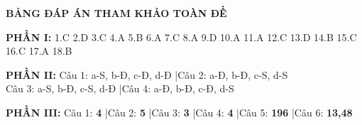 \documentclass[11pt,a4paper]{article}
\begin{document}
\vspace{0.3cm}
\noindent
\textbf{\color{hfRed}\large BẢNG ĐÁP ÁN THAM KHẢO TOÀN ĐỀ}

\vspace{0.1cm}
\noindent
\textbf{\color{mainGreen}PHẦN I:} 1.C \quad 2.D \quad 3.C \quad 4.A \quad 5.B \quad 6.A \quad 7.C \quad 8.A \quad 9.D \quad 10.A \quad 11.A \quad 12.C \quad 13.D \quad 14.B \quad 15.C \quad 16.C \quad 17.A \quad 18.B

\vspace{0.1cm}
\noindent
\textbf{\color{mainGreen}PHẦN II:} Câu 1: a-S, b-Đ, c-Đ, d-Đ \quad|\quad Câu 2: a-Đ, b-Đ, c-S, d-S\\
Câu 3: a-S, b-Đ, c-S, d-Đ \quad|\quad Câu 4: a-Đ, b-Đ, c-Đ, d-S

\vspace{0.1cm}
\noindent
\textbf{\color{mainGreen}PHẦN III:} Câu 1: \textbf{4} \quad|\quad Câu 2: \textbf{5} \quad|\quad Câu 3: \textbf{3} \quad|\quad Câu 4: \textbf{4} \quad|\quad Câu 5: \textbf{196} \quad|\quad Câu 6: \textbf{13,48}

\end{document}
